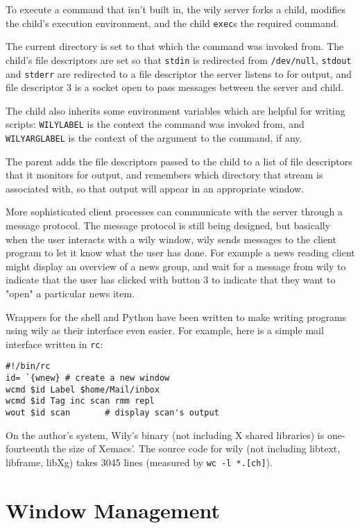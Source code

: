 \documentclass[twocolumn]{article}
\begin{document}
To execute a command that isn't built in, the wily server forks a child, modifies
the child's execution environment, and the child \texttt{exec}s the required command.

The current directory is set to that which
the command was invoked from.   The child's file descriptors are set so that
\texttt{stdin} is redirected from \texttt{/dev/null},
\texttt{stdout} and \texttt{stderr} are redirected to a file
descriptor the server listens to for output, and file descriptor 3 is a socket open
to pass messages between the server and child.

The child also inherits some environment variables which are helpful for writing
scripts: \texttt{WILYLABEL} is the context the command was invoked from,
and \texttt{WILYARGLABEL} is the context of the argument to the command,
if any.

The parent adds the file descriptors passed to the child to a list of
file descriptors that it monitors for output, and remembers which directory
that stream is associated with, so that output will appear in an appropriate window.

More sophisticated client processes can communicate
with the server through a message
protocol.  The message protocol is still being designed, but basically
when the user interacts with a wily window, wily sends messages to
the client program to let it know what the user has done.  For example
a news reading client might display an overview of a news group, and
wait for a message from wily to indicate that the user has clicked
with button 3 to indicate that they want to "open" a particular news item.

Wrappers for the shell and Python\cite{python}
have been written to make writing programs
using wily as their interface even easier.  For example, here is a simple mail interface
written in \texttt{rc}:
\begin{verbatim}
#!/bin/rc
id= `{wnew}	# create a new window
wcmd $id Label $home/Mail/inbox
wcmd $id Tag inc scan rmm repl
wout $id scan		# display scan's output
\end{verbatim}
 
On the author's system,
Wily's binary (not including X shared libraries) is one-fourteenth the size
of Xemacs'.  The source code for wily (not including libtext, libframe, libXg) takes
3045 lines (measured by \texttt{wc -l *.[ch]}).

\section{Window Management}
\end{document}
